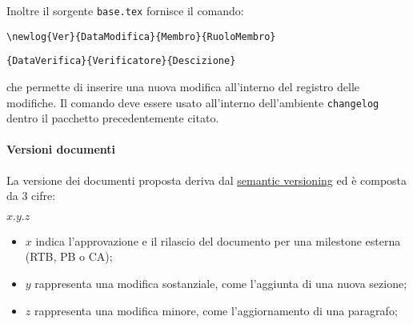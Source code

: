             Inoltre il sorgente \verb|base.tex| fornisce il comando:
            \begin{center}
                \verb*|\newlog{Ver}{DataModifica}{Membro}{RuoloMembro}|\par\verb|{DataVerifica}{Verificatore}{Descizione}|
            \end{center}
            che permette di inserire una nuova modifica all'interno del registro delle modifiche. Il comando deve essere usato all'interno dell'ambiente \verb|changelog| dentro il pacchetto precedentemente citato.

        \paragraph{Versioni documenti} \label{sec:doc_version}%
            La versione dei documenti proposta deriva dal \href{https://semver.org/}{semantic versioning} ed è composta da 3 cifre:
            \begin{center}
                $x.y.z$
            \end{center}
            \begin{itemize}
            	\item $x$ indica l'approvazione e il rilascio del documento per una milestone esterna (RTB, PB o CA);
                \item $y$ rappresenta una modifica sostanziale, come l'aggiunta di una nuova sezione;
                \item $z$ rappresenta una modifica minore, come l'aggiornamento di una paragrafo;
            \end{itemize}

